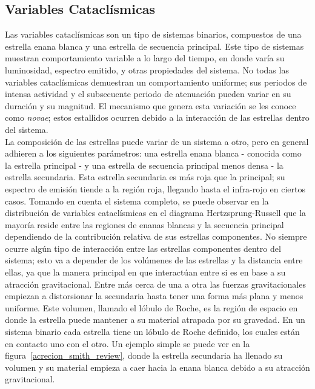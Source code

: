 \subsection*{Variables Cataclísmicas}
Las variables cataclísmicas son un tipo de sistemas binarios, compuestos de una estrella enana blanca y una estrella de secuencia principal. Este tipo de sistemas muestran comportamiento variable a lo largo del tiempo, en donde varía su luminosidad, espectro emitido, y otras propiedades del sistema. No todas las variables cataclísmicas demuestran un comportamiento uniforme; sus periodos de intensa actividad y el subsecuente periodo de atenuación pueden variar en su duración y su magnitud. El mecanismo que genera esta variación se les conoce como \textit{novae}; estos estallidos ocurren debido a la interacción de las estrellas dentro del sistema.
\\\newline
La composición de las estrellas puede variar de un sistema a otro, pero en general adhieren a los siguientes parámetros: una estrella enana blanca - conocida como la estrella principal - y una estrella de secuencia principal menos densa - la estrella secundaria. Esta estrella secundaria es más roja que la principal; su espectro de emisión tiende a la región roja, llegando hasta el infra-rojo en ciertos casos. Tomando en cuenta el sistema completo, se puede observar en la distribución de variables cataclísmicas en el diagrama Hertzsprung-Russell que la mayoría reside entre las regiones de enanas blancas y la secuencia principal dependiendo de la contribución relativa de sus estrellas componentes. \citet{disentanglingGaiaHR} No siempre ocurre algún tipo de interacción entre las estrellas componentes dentro del sistema; esto va a depender de los volúmenes de las estrellas y la distancia entre ellas, ya que la manera principal en que interactúan entre si es en base a su atracción gravitacional. Entre más cerca de una a otra las fuerzas gravitacionales empiezan a distorsionar la secundaria hasta tener una forma más plana y menos uniforme. Este volumen, llamado el lóbulo de Roche, es la región de espacio en donde la estrella puede mantener a su material atrapada por su gravedad. En un sistema binario cada estrella tiene un lóbulo de Roche definido, los cuales están en contacto uno con el otro. Un ejemplo simple se puede ver en la figura~\ref{acrecion_smith_review}, donde la estrella secundaria ha llenado su volumen y su material empieza a caer hacia la enana blanca debido a su atracción gravitacional.
\\\newline

